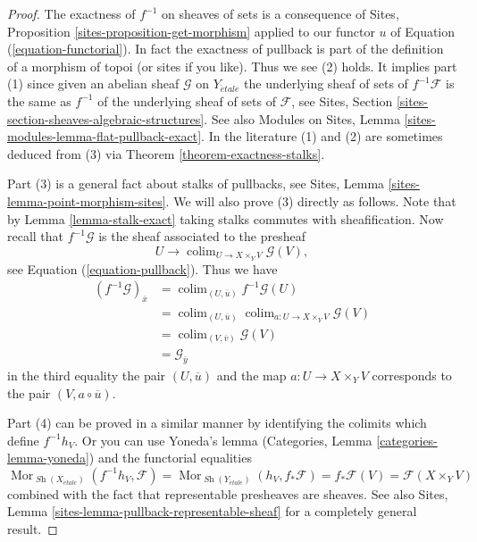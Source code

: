 \documentclass[10pt,a4paper]{amsart}
\theoremstyle{plain}
\theoremstyle{definition}
\theoremstyle{remark}
\numberwithin{equation}{subsection}
\def\colim{\mathop{\mathrm{colim}}\nolimits}
\def\Mor{\mathop{\mathrm{Mor}}\nolimits}
\def\Sh{\mathop{\mathit{Sh}}\nolimits}
\def\etale{{\acute{e}tale}}
\begin{document}
\begin{proof}
The exactness of $f^{-1}$ on sheaves of sets is a consequence of
Sites, Proposition \ref{sites-proposition-get-morphism}
applied to our functor $u$ of Equation (\ref{equation-functorial}).
In fact the exactness of pullback is part of the definition of
a morphism of topoi (or sites if you like). Thus we see (2) holds.
It implies part (1) since given an abelian sheaf $\mathcal{G}$ on
$Y_\etale$
the underlying sheaf of sets of $f^{-1}\mathcal{F}$ is the same
as $f^{-1}$ of the underlying sheaf of sets of $\mathcal{F}$, see
Sites, Section \ref{sites-section-sheaves-algebraic-structures}.
See also
Modules on Sites, Lemma \ref{sites-modules-lemma-flat-pullback-exact}.
In the literature (1) and (2) are sometimes deduced from (3) via
Theorem \ref{theorem-exactness-stalks}.

\medskip\noindent
Part (3) is a general fact about stalks of pullbacks, see
Sites, Lemma \ref{sites-lemma-point-morphism-sites}.
We will also prove (3) directly as follows. Note that by
Lemma \ref{lemma-stalk-exact}
taking stalks commutes with sheafification.
Now recall that $f^{-1}\mathcal{G}$ is the sheaf
associated to the presheaf
$$
U \longrightarrow \colim_{U \to X \times_Y V} \mathcal{G}(V),
$$
see Equation (\ref{equation-pullback}).
Thus we have
\begin{align*}
(f^{-1}\mathcal{G})_{\overline{x}}
& = \colim_{(U, \overline{u})} f^{-1}\mathcal{G}(U) \\
& = \colim_{(U, \overline{u})}
\colim_{a : U \to X \times_Y V} \mathcal{G}(V) \\
& = \colim_{(V, \overline{v})} \mathcal{G}(V) \\
& = \mathcal{G}_{\overline{y}}
\end{align*}
in the third equality the pair $(U, \overline{u})$ and the map
$a : U \to X \times_Y V$ corresponds to the pair $(V, a \circ \overline{u})$.

\medskip\noindent
Part (4) can be proved in a similar manner by identifying the colimits
which define $f^{-1}h_V$. Or you can use
Yoneda's lemma (Categories, Lemma \ref{categories-lemma-yoneda})
and the functorial equalities
$$
\Mor_{\Sh(X_\etale)}(f^{-1}h_V, \mathcal{F}) =
\Mor_{\Sh(Y_\etale)}(h_V, f_*\mathcal{F}) =
f_*\mathcal{F}(V) = \mathcal{F}(X \times_Y V)
$$
combined with the fact that representable presheaves are sheaves. See also
Sites, Lemma \ref{sites-lemma-pullback-representable-sheaf}
for a completely general result.
\end{proof}
\end{document}
